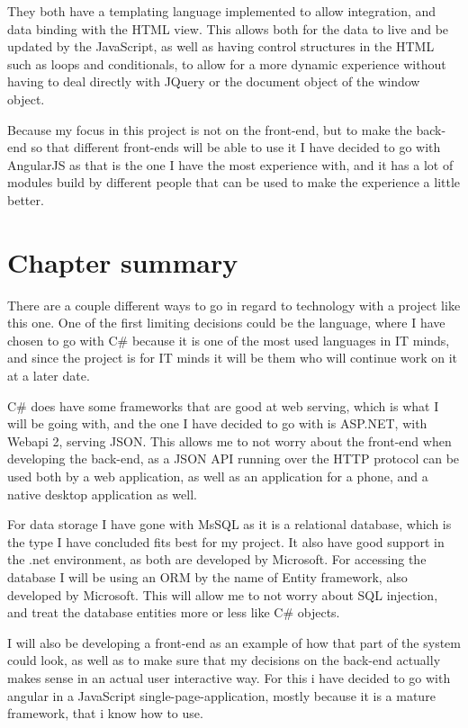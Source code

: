 They both have a templating language implemented to allow integration, and
data binding with the HTML view. This allows both for the data to live and be
updated by the JavaScript, as well as having control structures in the HTML such
as loops and conditionals, to allow for a more dynamic experience without having
to deal directly with JQuery or the document object of the window object. 

Because my focus in this project is not on the front-end, but to make the back-end
so that different front-ends will be able to use it I have decided to go with
AngularJS as that is the one I have the most experience with, and it has a lot
of modules build by different people that can be used to make the experience a
little better. 

\section{Chapter summary }
There are a couple different ways to go in regard to technology with a project
like this one. One of the first limiting decisions could be the language, where
I have chosen to go with C\# because it is one of the most used languages in IT
minds, and since the project is for IT minds it will be them who will continue
work on it at a later date.

C\# does have some frameworks that are good at web serving, which is what I will
be going with, and the one I have decided to go with is ASP.NET, with Webapi 2,
serving JSON. This allows me to not worry about the front-end when developing the
back-end, as a JSON API running over the HTTP protocol can be used both by a web
application, as well as an application for a phone, and a native desktop
application as well.

For data storage I have gone with MsSQL as it is a relational database, which is
the type I have concluded fits best for my project. It also have good support in
the .net environment, as both are developed by Microsoft. For accessing the
database I will be using an ORM by the name of Entity framework, also developed
by Microsoft. This will allow me to not worry about SQL injection, and treat the
database entities more or less like C\# objects.

I will also be developing a front-end as an example of how that part of the
system could look, as well as to make sure that my decisions on the back-end
actually makes sense in an actual user interactive way. For this i have decided
to go with angular in a JavaScript single-page-application, mostly because it is
a mature framework, that i know how to use.
